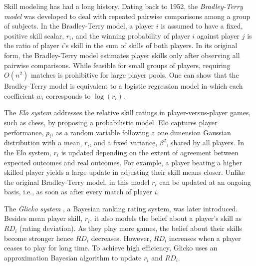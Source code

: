 
Skill modeling has had a long history. Dating back to 1952, the \textit{Bradley-Terry model} \citep{bradley1952rank} was developed to deal with repeated pairwise comparisons among a group of subjects. In the Bradley-Terry model, a player $i$ is assumed to have a fixed, positive skill scalar, $r_i$, and the winning probability of player $i$ against player $j$ is the ratio of player $i$'s skill in the sum of skills of both players. In its original form, the Bradley-Terry model estimates player skills only after observing all pairwise comparisons. While feasible for small groups of players, requiring $O(n^2)$ matches is prohibitive for large player pools. One can show that the Bradley-Terry model is equivalent to a logistic regression model \citep{agresti2011categorical} in which each coefficient $w_i$ corresponds to $\log(r_i)$.

The \textit{Elo system} \citep{elo1978rating} addresses the relative skill ratings in player-versus-player games, such as chess, by proposing a probabilistic model. Elo captures player performance, $p_i$, as a random variable following a one dimension Gaussian distribution with a mean, $r_i$, and a fixed variance, $\beta^2$, shared by all players. In the Elo system, $r_i$ is updated depending on the extent of agreement between expected outcomes and real outcomes. For example, a player beating a higher skilled player yields a large update in adjusting their skill means closer. Unlike the original Bradley-Terry model, in this model $r_i$ can be updated at an ongoing basis, i.e., as soon as after every match of player $i$.

The \textit{Glicko system} \citep{glickman1999parameter}, a Bayesian ranking rating system, was later introduced. Besides mean player skill, $r_i$, it also models the belief about a player's skill as $RD_i$ (rating deviation). As they play more games, the belief about their skills become stronger hence $RD_i$ decreases. However, $RD_i$ increases when a player ceases to play for long time. To achieve high efficiency, Glicko uses an approximation Bayesian algorithm to update $r_i$ and $RD_i$.


